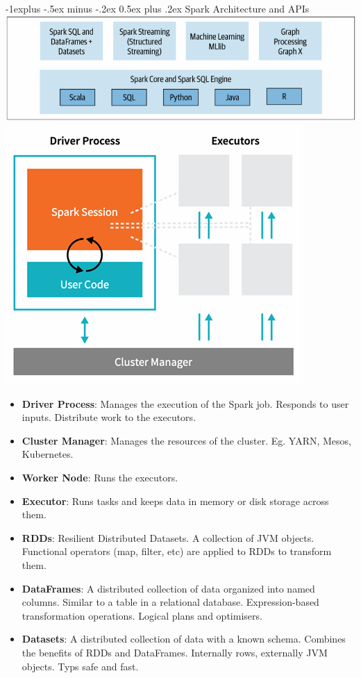 \documentclass[10pt, landscape]{article}
\makeatletter
\renewcommand{\subsection}{\@startsection{subsection}{2}{0mm}%
  {-1explus -.5ex minus -.2ex}%
  {0.5ex plus .2ex}%
{\normalfont\normalsize\bfseries}}
\makeatother
\begin{document}
\begin{multicols*}{4}
  \subsection {Spark Architecture and APIs}
  \includegraphics[width=0.95\linewidth]{spark_component_api_stack.png} 
  \includegraphics[width=0.95\linewidth]{spark_architecture.png} 
  \begin{itemize}
    \item \textbf{Driver Process}: Manages the execution of the Spark job. Responds to user inputs. Distribute work to the executors.
    \item \textbf{Cluster Manager}: Manages the resources of the cluster. Eg. YARN, Mesos, Kubernetes.
    \item \textbf{Worker Node}: Runs the executors.
    \item \textbf{Executor}: Runs tasks and keeps data in memory or disk storage across them.
    \item \textbf{RDDs}: Resilient Distributed Datasets. A collection of JVM objects. Functional operators (map, filter, etc) are applied to RDDs to transform them.
    \item \textbf{DataFrames}: A distributed collection of data organized into named columns. Similar to a table in a relational database. Expression-based transformation operations. Logical plans and optimisers.
    \item \textbf{Datasets}: A distributed collection of data with a known schema. Combines the benefits of RDDs and DataFrames. Internally rows, externally JVM objects. Typs safe and fast.
  \end{itemize}


\end{multicols*}
\end{document}
